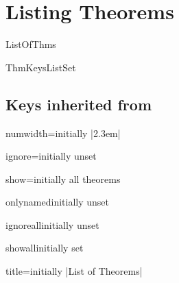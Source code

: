 \documentclass{ltxdoc}
\begin{document}
\section{Listing Theorems}

\begin{docCommand}{ListOfThms}{}

\end{docCommand}

\begin{docCommand}{ThmKeysListSet}{}

\end{docCommand}

\subsection{Keys inherited from }

\begin{docKey}{numwidth}{=}{initially |2.3em|}

\end{docKey}

\begin{docKey}{ignore}{=}{initially unset}

\end{docKey}

\begin{docKey}{show}{=}{initially all theorems}

\end{docKey}

\begin{docKey}{onlynamed}{}{initially unset}

\end{docKey}

\begin{docKey}{ignoreall}{}{initially unset}

\end{docKey}

\begin{docKey}{showall}{}{initially set}

\end{docKey}

\begin{docKey}{title}{=}{initially |List of Theorems|}

\end{docKey}
\end{document}
